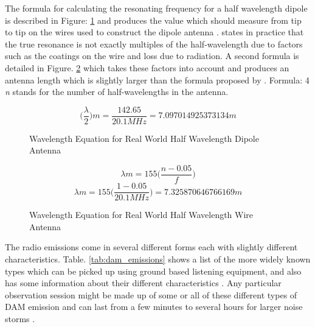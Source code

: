 \documentclass[runningheads,a4paper]{llncs}
\begin{document}
The formula for calculating the resonating frequency for a half wavelength dipole is described in Figure: \ref{fig:wavelength_equation_dipole} and produces the value which should measure from tip to tip on the wires used to construct the dipole antenna \citep{nasa12}. \cite{RSGB-14} states in practice that the true resonance is not exactly multiples of the half-wavelength due to factors such as the coatings on the wire and loss due to radiation. A second formula is detailed in Figure. \ref{fig:wavelength_equation_wire_antenna} which takes these factors into account and produces an antenna length which is slightly larger than the formula proposed by \citep{nasa12}. Formula: 4 \textit{n} stands for the number of half-wavelengths in the antenna.

%
\begin{figure}[here]
  \centering
  \begin{equation}  	
    \bigg(\frac{\lambda}{2}\bigg)m = \frac{142.65}{20.1 MHz} = 7.097014925373134 m
  \end{equation}
  \caption{Wavelength Equation for Real World Half Wavelength Dipole Antenna}
  \label{fig:wavelength_equation_dipole}
\end{figure}
%

%
\begin{figure}[here]
  \centering
  \begin{equation}  	
    \lambda m = 155 \bigg(\frac{n - 0.05}{f}\bigg)
  \end{equation}
  \begin{equation}  	
    \lambda m = 155 \bigg(\frac{1 - 0.05}{20.1 MHz}\bigg)  = 7.325870646766169 m
  \end{equation}
  \caption{Wavelength Equation for Real World Half Wavelength Wire Antenna}
  \label{fig:wavelength_equation_wire_antenna}
\end{figure}
%

The radio emissions come in several different forms each with slightly different characteristics. Table. \ref{tab:dam_emissions} shows a list of the more widely known types which can be picked up using ground based listening equipment, and also has some information about their different characteristics \citep{wilkinson94}. Any particular observation session might be made up of some or all of these different types of \gls{DAM} emission and can last from a few minutes to several hours for larger noise storms \citep{wilkinson94}.
\end{document}
